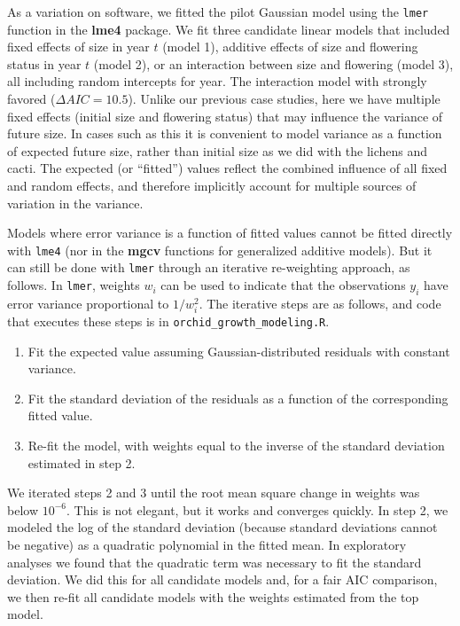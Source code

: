 \documentclass[12pt]{article}
\begin{document}
\begin{spacing}{1.9}
As a variation on software, we fitted the pilot Gaussian model using the \texttt{lmer} function in the \textbf{lme4} package.
We fit three candidate linear models that included fixed effects of size in year $t$ (model 1), additive effects of size and flowering status in year $t$ (model 2), or an interaction between size and flowering (model 3), all including random intercepts for year. 
The interaction model with strongly favored ($\Delta AIC = 10.5$). 
Unlike our previous case studies, here we have multiple fixed effects (initial size and flowering status) that may influence the variance of future size. 
In cases such as this it is convenient to model variance as a function of expected future size, rather than initial size as we did with the lichens and cacti. 
The expected (or ``fitted'') values reflect the combined influence of all fixed and random effects, and therefore implicitly account for multiple sources of variation in the variance. 

Models where error variance is a function of fitted values cannot be fitted directly with \texttt{lme4} (nor 
in the \textbf{mgcv} functions for generalized additive models). 
But it can still be done with \texttt{lmer} through an iterative re-weighting approach, as follows. 
In \texttt{lmer}, weights $w_{i}$ can be used to indicate that the observations $y_{i}$ have error variance proportional to $1/w_i^2$. 
The iterative steps are as follows, and code that executes these steps is in \texttt{orchid\_growth\_modeling.R}. 
\begin{enumerate}
	\item Fit the expected value assuming Gaussian-distributed residuals with constant variance. 
	\item Fit the standard deviation of the residuals as a function of the corresponding fitted value. 
	\item Re-fit the model, with weights equal to the inverse of the standard deviation estimated in step 2. 
\end{enumerate}
We iterated steps 2 and 3 until the root mean square change in weights was below $10^{-6}$. 
This is not elegant, but it works and converges quickly. 
In step 2, we modeled the log of the standard deviation (because standard deviations cannot be negative) as a quadratic polynomial in the fitted mean.  
In exploratory analyses we found that the quadratic term was necessary to fit the standard deviation. 
We did this for all candidate models and, for a fair AIC comparison, we then re-fit all candidate models with the weights estimated from the top model. 


\end{spacing}
\end{document}
